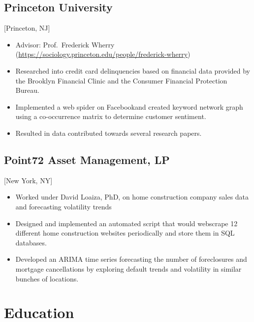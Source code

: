 \documentclass{rkim-resume}
\begin{document}
\subsection{Princeton University}[Princeton, NJ]
\begin{positions}
\end{positions}

\begin{itemize}
  \item Advisor: Prof.~Frederick Wherry (\href{https://sociology.princeton.edu/people/frederick-wherry}{https://sociology.princeton.edu/people/frederick-wherry})
  \item Researched into credit card delinquencies based on financial data provided by the Brooklyn Financial Clinic and the Consumer Financial Protection Bureau.
  \item Implemented a web spider on Facebook\@ and created keyword network graph using a co-occurrence matrix to determine customer sentiment.
  \item Resulted in data contributed towards several research papers.
\end{itemize}

\subsection{Point72 Asset Management, LP}[New York, NY]
\begin{positions}
\end{positions}

\begin{itemize}
  \item Worked under David Loaiza, PhD, on home construction company sales data and forecasting volatility trends
  \item Designed and implemented an automated script that would webscrape 12 different home construction websites periodically and store them in SQL databases.
  \item Developed an ARIMA time series forecasting the number of foreclosures and mortgage cancellations by exploring default trends and volatility in similar bunches of locations. 
\end{itemize}

\section{Education}
\end{document}

